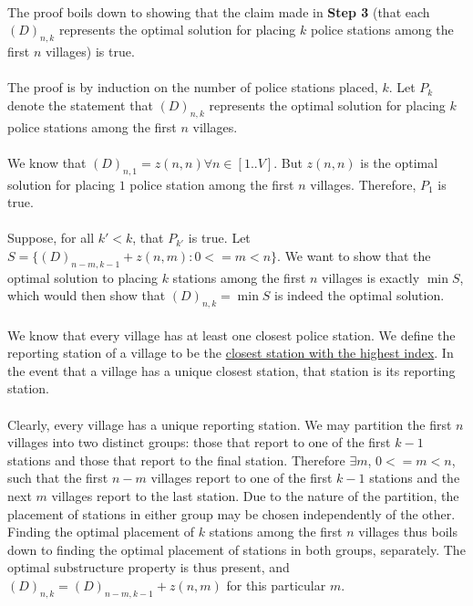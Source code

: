 \documentclass[twocolumn]{article}
\begin{document}
		\paragraph{}
		The proof boils down to showing that the claim made in \textbf{Step 3} (that each $(D)_{n, k}$ represents the optimal solution for placing $k$ police stations among the first $n$ villages) is true.
		
		\paragraph{}
		The proof is by induction on the number of police stations placed, $k$. Let $P_k$ denote the statement that $(D)_{n, k}$ represents the optimal solution for placing $k$ police stations among the first $n$ villages.
		
		\paragraph{}
		We know that $(D)_{n, 1} = z(n, n) \forall n \in [1..V]$. But $z(n, n)$ is the optimal solution for placing $1$ police station among the first $n$ villages. Therefore, $P_1$ is true.
		
		\paragraph{}
		Suppose, for all $k' < k$, that $P_{k'}$ is true. Let $S = \{(D)_{n-m, k-1} + z(n, m) : 0 <= m < n\}$. We want to show that the optimal solution to placing $k$ stations among the first $n$ villages is exactly $\min S$, which would then show that $(D)_{n, k} = \min S$ is indeed the optimal solution.
		
		\paragraph{}
		We know that every village has at least one closest police station. We define the reporting station of a village to be the \underline{closest station with the highest index}. In the event that a village has a unique closest station, that station is its reporting station.
		
		\paragraph{}
		Clearly, every village has a unique reporting station. We may partition the first $n$ villages into two distinct groups: those that report to one of the first $k-1$ stations and those that report to the final station. Therefore $\exists m$, $0 <= m < n$, such that the first $n-m$ villages report to one of the first $k-1$ stations and the next $m$ villages report to the last station. Due to the nature of the partition, the placement of stations in either group may be chosen independently of the other. Finding the optimal placement of $k$ stations among the first $n$ villages thus boils down to finding the optimal placement of stations in both groups, separately. The optimal substructure property is thus present, and $(D)_{n, k} = (D)_{n - m, k-1} + z(n, m)$ for this particular $m$.
		
\end{document}

